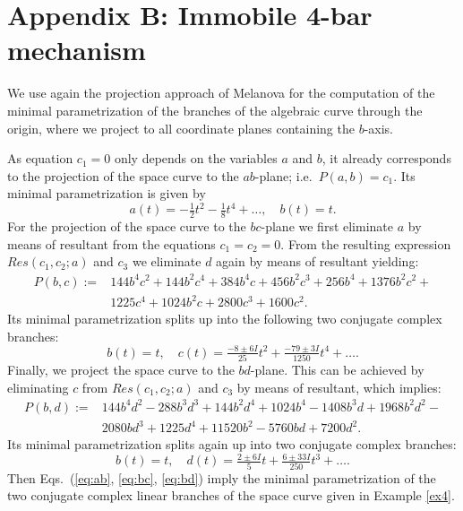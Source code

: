 \documentclass{svproc}
\begin{document}

\section*{Appendix B: Immobile 4-bar mechanism}

We use again the projection approach of Melanova \cite{melanova} for the computation of the minimal parametrization of the branches of the algebraic curve through the origin, where we project to all coordinate planes containing the $b$-axis.  


As equation $c_1=0$ only depends on the variables $a$ and $b$, it already corresponds to the projection of the space curve to the $ab$-plane; i.e.\ $P(a,b)=c_1$. Its minimal parametrization is given by 
\begin{equation}\label{eq:ab}
a(t)=-\tfrac{1}{2}t^2   -\tfrac{1}{8}t^4  + \ldots,\quad
b(t)=t.
\end{equation}
For the projection of the space curve to the $bc$-plane we first eliminate $a$ by means of resultant from the equations $c_1=c_2=0$. From the resulting expression $Res(c_1,c_2;a)$ and $c_3$ we eliminate $d$ again by means of resultant yielding:
\begin{equation}
 \begin{split}
  P(b,c):= &144b^4c^2 + 144b^2c^4 + 384b^4c + 456b^2c^3 + 256b^4 + 1376b^2c^2 +  \\
    &1225c^4 + 1024b^2c + 2800c^3 + 1600c^2.
 \end{split}    
\end{equation}
Its minimal parametrization splits up into the following two conjugate complex branches:
\begin{equation}\label{eq:bc}
b(t)=t,\quad
c(t)=\tfrac{-8 \pm 6I}{25}t^2 + \tfrac{-79 \pm 3I}{1250}t^4 + \ldots .
\end{equation}
Finally, we project the space curve to the $bd$-plane. This can be achieved by eliminating $c$ from $Res(c_1,c_2;a)$ and $c_3$ by means of resultant, which implies:
\begin{equation}
 \begin{split}
  P(b,d):= 
  &144b^4d^2 - 288b^3d^3 + 144b^2d^4 + 1024b^4 - 1408b^3d + 
  1968b^2d^2 - \\ &2080bd^3 + 
  1225d^4 + 11520b^2 - 5760bd + 7200d^2.
 \end{split}    
\end{equation}
Its minimal parametrization splits again up into two conjugate complex branches:
\begin{equation}\label{eq:bd}
b(t)=t,\quad
d(t)=\tfrac{2\pm 6I}{5}t+ \tfrac{6\pm 33I}{250}t^3 +\ldots .
\end{equation}
Then Eqs.\ (\ref{eq:ab}, \ref{eq:bc}, \ref{eq:bd}) imply the minimal parametrization of the two conjugate complex linear branches of the space curve given in Example \ref{ex4}. 
\end{document}
